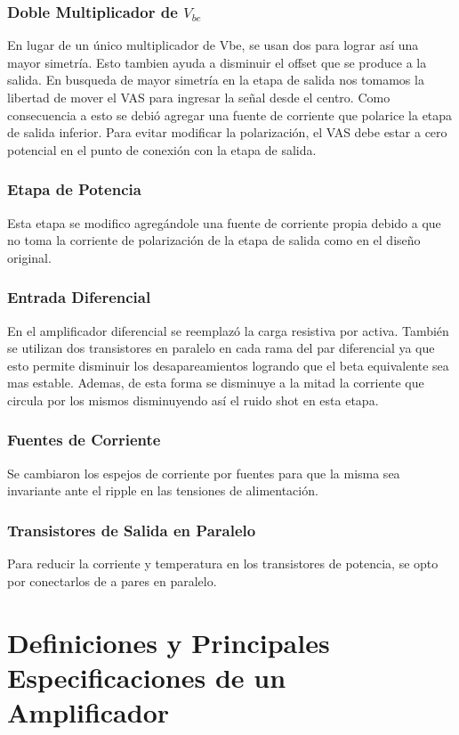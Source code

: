 \documentclass[a4paper,12pt,twoside]{article}
\begin{document}
\subsubsection{Doble Multiplicador de $V_{be}$}
En lugar de un único multiplicador de Vbe, se usan dos para lograr así una mayor simetría. Esto tambien ayuda a disminuir el offset que se produce a la salida. En busqueda de mayor simetría en la etapa de salida nos tomamos la libertad de mover el VAS para ingresar la señal desde el centro. Como consecuencia a esto se debió agregar una fuente de corriente que polarice la etapa de salida inferior. Para evitar modificar la polarización, el VAS debe estar a cero potencial en el punto de conexión con la etapa de salida.

\subsubsection{Etapa de Potencia}
Esta etapa se modifico agregándole una fuente de corriente propia debido a que no toma la corriente de polarización de la etapa de salida como en el diseño original.

\subsubsection{Entrada Diferencial}
En el amplificador diferencial se reemplazó la carga resistiva por activa. También se utilizan dos transistores en paralelo en cada rama del par diferencial ya que esto permite disminuir los desapareamientos logrando que el beta equivalente sea mas estable. Ademas, de esta forma se disminuye a la mitad la corriente que circula por los mismos disminuyendo así el ruido shot en esta etapa.
 
\subsubsection{Fuentes de Corriente}
Se cambiaron los espejos de corriente por fuentes para que la misma sea invariante ante el ripple en las tensiones de alimentación. 

\subsubsection{Transistores de Salida en Paralelo}
Para reducir la corriente y temperatura en los transistores de potencia, se opto por conectarlos de a pares en paralelo.

\newpage
\section{Definiciones y Principales Especificaciones de un Amplificador}
\bigskip
\end{document}

